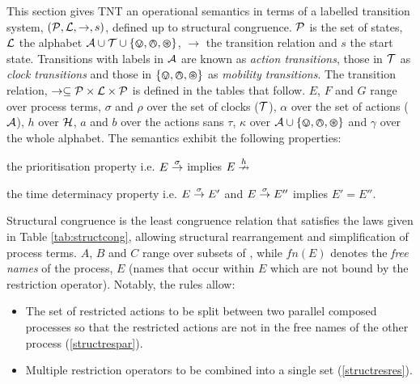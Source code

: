 \documentclass[orivec,envcountsame]{llncs}
\begin{document}
This section gives TNT an operational semantics in terms of a labelled
transition system, $(\text{$\mathcal{P}$}, \text{$\mathcal{L}$}, \rightarrow, s)$, defined
up to structural congruence.  $\text{$\mathcal{P}$}$ is the set of states, $\text{$\mathcal{L}$}$ the
alphabet $\text{$\mathcal{A}$} \cup \text{$\mathcal{T}$} \cup \text{$\{ \varovee, \varowedge , \varoast\}$}$, $\rightarrow$ the
transition relation and $s$ the start state.  Transitions with labels in
$\text{$\mathcal{A}$}$ are known as \emph{action transitions}, those in $\text{$\mathcal{T}$}$ as
\emph{clock transitions} and those in $\text{$\{ \varovee, \varowedge , \varoast\}$}$ as \emph{mobility
transitions}.  The transition relation, $\rightarrow \subseteq
\text{$\mathcal{P}$} \times \text{$\mathcal{L}$} \times \text{$\mathcal{P}$}$ is defined in the tables that follow.
$E$, $F$ and $G$ range over process terms, $\sigma$ and $\rho$ over the
set of clocks ($\text{$\mathcal{T}$}$), $\alpha$ over the set of actions
($\text{$\mathcal{A}$}$), $h$ over $\text{$\mathcal{H}$}$, $a$ and $b$ over the actions
sans $\tau$, $\kappa$ over $\text{$\mathcal{A}$} \cup \text{$\{ \varovee, \varowedge , \varoast\}$}$
and $\gamma$ over the whole alphabet.  The semantics exhibit the
following properties:
\begin{proposition}
the prioritisation property
i.e. $E \stackrel{\sigma}{\rightarrow}$ implies $E \stackrel{h}{\nrightarrow}$ 
\end{proposition}
\begin{proposition}
the time determinacy property i.e. $E \stackrel{\sigma}{\rightarrow} E'$ and $E
\stackrel{\sigma}{\rightarrow} E''$ implies $E' = E''$.
\end{proposition}
Structural congruence is the least congruence relation that satisfies
the laws given in Table \ref{tab:structcong}, allowing structural
rearrangement and simplification of process terms. $A$, $B$
and $C$ range over subsets of \actions, while $fn(E)$ denotes the
\emph{free names} of the process, $E$ (names that occur within $E$ which
are not bound by the restriction operator).  Notably, the rules allow:
 
\begin{itemize}
\item The set of restricted actions to be split between two parallel
      composed processes so that the restricted actions are not in the
      free names of the other process \textsf{(\ref{structrespar})}.
\item Multiple restriction operators to be combined into a single set
      \textsf{(\ref{structresres})}.
\end{itemize}
\end{document}
